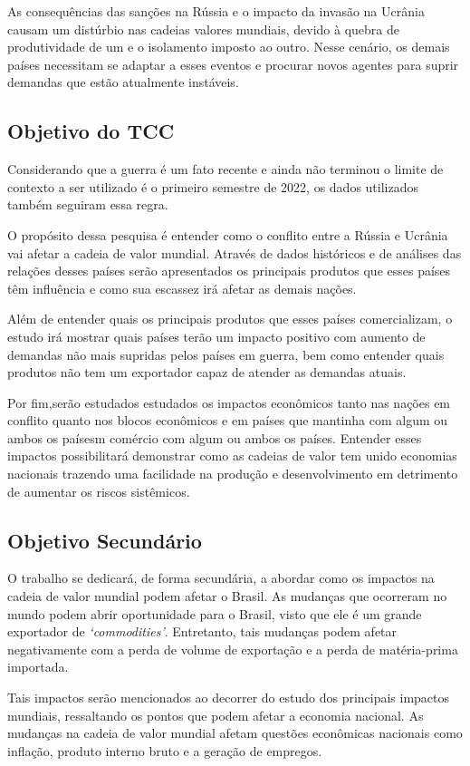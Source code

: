 \documentclass[12pt]{article}
\begin{document}
As consequências das sanções na Rússia e o impacto da invasão na Ucrânia causam um distúrbio nas cadeias valores mundiais, devido à quebra de produtividade de um e o isolamento imposto ao outro. Nesse cenário, os demais países necessitam se adaptar a esses eventos e procurar novos agentes para suprir demandas que estão atualmente instáveis.

\subsection{Objetivo do TCC}
Considerando que a guerra é um fato recente e ainda não terminou o limite de contexto a ser utilizado é o primeiro semestre de 2022, os dados utilizados também seguiram essa regra.

O propósito dessa pesquisa é entender como o conflito entre a Rússia e Ucrânia vai afetar a cadeia de valor mundial. Através de dados históricos e de análises das relações desses países serão apresentados os principais produtos que esses países têm influência e como sua escassez irá afetar as demais nações.

Além de entender quais os principais produtos que esses países comercializam, o estudo irá mostrar quais países terão um impacto positivo com aumento de demandas não mais supridas pelos países em guerra, bem como entender quais produtos não tem um exportador capaz de atender as demandas atuais. 

Por fim,serão estudados estudados os impactos econômicos tanto nas nações em conflito quanto nos blocos econômicos e em países que mantinha com algum ou ambos os paísesm comércio com algum ou ambos os países. Entender esses impactos possibilitará demonstrar como as cadeias de valor tem unido economias nacionais trazendo uma facilidade na produção e desenvolvimento em detrimento de aumentar os riscos sistêmicos.

\subsection{Objetivo Secundário}
O trabalho se dedicará, de forma secundária, a abordar como os impactos na cadeia de valor mundial podem afetar o Brasil. As mudanças que ocorreram no mundo podem abrir oportunidade para o Brasil, visto que ele é um grande exportador de \emph{‘commodities’}. Entretanto, tais mudanças podem afetar negativamente com a perda de volume de exportação e a perda de matéria-prima importada.

Tais impactos serão mencionados ao decorrer do estudo dos principais impactos mundiais, ressaltando os pontos que podem afetar a economia nacional. As mudanças na cadeia de valor mundial afetam questões econômicas nacionais como inflação, produto interno bruto e a geração de empregos. 
\end{document}

